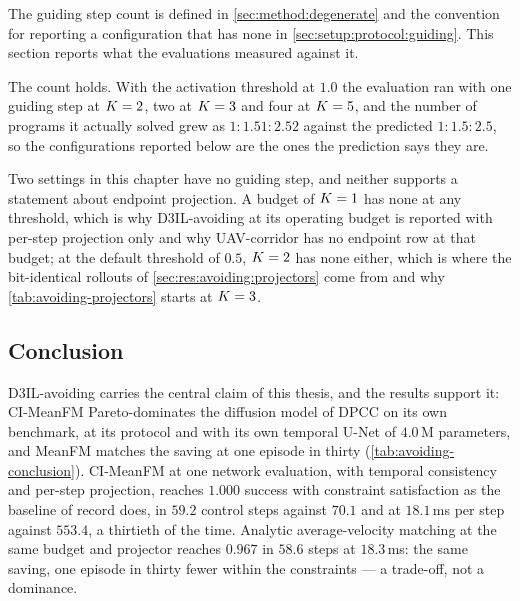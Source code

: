 The guiding step count is defined in \autoref{sec:method:degenerate} and the convention for reporting a
configuration that has none in \autoref{sec:setup:protocol:guiding}. This section reports what the
evaluations measured against it.

The count holds. With the activation threshold at $1.0$ the evaluation ran with one guiding step at
$K=2$, two at $K=3$ and four at $K=5$, and the number of programs it actually solved grew as
$1:1.51:2.52$ against the predicted $1:1.5:2.5$, so the configurations reported below are the ones the
prediction says they are.

Two settings in this chapter have no guiding step, and neither supports a statement about endpoint
projection. A budget of $K=1$ has none at any threshold, which is why D3IL-avoiding at its operating
budget is reported with per-step projection only and why UAV-corridor has no endpoint row at that budget;
at the default threshold of $0.5$, $K=2$ has none either, which is where the bit-identical rollouts
of \autoref{sec:res:avoiding:projectors} come from and why \autoref{tab:avoiding-projectors} starts at
$K=3$.


\subsection{Conclusion}\label{sec:res:avoiding:conclusion}

D3IL-avoiding carries the central claim of this thesis, and the results support it: CI-MeanFM
Pareto-dominates the diffusion model of \ac{DPCC} on its own benchmark, at its protocol and with its own
temporal U-Net of $4.0$\,M parameters, and MeanFM matches the saving at one episode in thirty
(\autoref{tab:avoiding-conclusion}). CI-MeanFM at one network evaluation, with temporal consistency and
per-step projection, reaches $1.000$ success with constraint satisfaction as the baseline of record does, in
$59.2$ control steps against $70.1$ and at $18.1$\,ms per step against $553.4$, a thirtieth of the time.
Analytic average-velocity matching at the same budget and projector reaches $0.967$ in $58.6$ steps at
$18.3$\,ms: the same saving, one episode in thirty fewer within the constraints --- a trade-off, not a
dominance.

